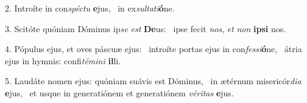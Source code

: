 2. Introíte in con\textit{spéc}\textit{tu} \textbf{e}jus, \ast\  in ex\textit{sul}\textit{ta}\textit{ti}\textbf{ó}ne.\

3. Scitóte quóniam Dóminus ip\textit{se} \textit{est} \textbf{De}us: \ast\  ipse fecit \textit{nos}, \textit{et} \textit{non} \textbf{ip}\textbf{si} nos.\

4. Pópulus ejus, et oves páscuæ ejus: \dag\  introíte portas ejus in con\textit{fes}\textit{si}\textbf{ó}ne, \ast\  átria ejus in hymnis: confi\textit{té}\textit{mi}\textit{ni} \textbf{il}li.\

5. Laudáte nomen ejus: quóniam suávis est Dóminus, \dag\  in ætérnum misericór\textit{di}\textit{a} \textbf{e}jus, \ast\  et usque in generatiónem et generatiónem \textit{vé}\textit{ri}\textit{tas} \textbf{e}jus.\

